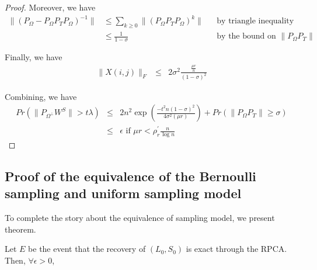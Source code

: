 \begin{proof}
Moreover, we have
\[
\begin{aligned}
\|(P_{\Omega}-P_{\Omega}P_{T}P_{\Omega})^{-1}\|
& \le \sum_{k\ge0}\|(P_{\Omega}P_{T}P_{\Omega})^{k}\|
&&\text{by triangle inequality}\\
& \le \frac{1}{1-\sigma}
&&\text{by the bound on } \|P_{\Omega}P_{T}\|
\end{aligned}
\]

Finally, we have
\begin{eqnarray*}
\|X(i,j)\|_{F} & \le & 2\sigma^{2}\frac{\frac{\mu r}{n}}{(1-\sigma)^{2}}
\end{eqnarray*}


Combining, we have
\begin{eqnarray*}
Pr(\|P_{\Omega^{\bot}}W^{S}\|>t\lambda) & \le & 2n^{2} \exp \left( \frac{-t^{2}n(1-\sigma)^{2}}{4\sigma^{2}(\mu r)} \right)+Pr(\|P_{\Omega}P_{T}\|\ge\sigma)\\
 & \le & \epsilon\text{ if }\mu r<\rho_{r}^{'}\frac{n}{\log n}
\end{eqnarray*}

\end{proof}



\subsection{Proof of the equivalence of the Bernoulli sampling and uniform sampling model } \label{sub:bernoullisampling}
To complete the story about the equivalence of sampling model, we present theorem.
\begin{theorem}
Let $E$ be the event that the recovery of $(L_{0},S_{0})$ is exact
through the RPCA. Then, $\forall\epsilon>0$,
\end{theorem}

